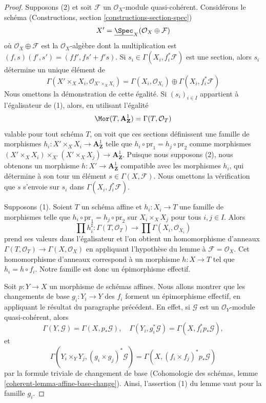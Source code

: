 \begin{proof}
Supposons (2) et soit $\mathcal{F}$ un $\mathcal{O}_X$-module quasi-cohérent.
Considérons le schéma
(Constructions, section \ref{constructions-section-spec})
$$
X' = \underline{\Spec}_X(\mathcal{O}_X \oplus \mathcal{F})
$$
où $\mathcal{O}_X \oplus \mathcal{F}$ est la $\mathcal{O}_X$-algèbre dont
la multiplication est
$(f, s)(f', s') = (ff', fs' + f's)$.
Si $s_i \in \Gamma(X_i, f_i^*\mathcal{F})$ est une section,
alors $s_i$ détermine un unique élément de
$$
\Gamma(X' \times_X X_i, \mathcal{O}_{X' \times_X X_i}) =
\Gamma(X_i, \mathcal{O}_{X_i}) \oplus \Gamma(X_i, f_i^*\mathcal{F})
$$
Nous omettons la démonstration de cette égalité.
Si $(s_i)_{i \in I}$ appartient à l'égalisateur de (1), alors, en utilisant
l'égalité
$$
\Mor(T, \mathbf{A}^1_\mathbf{Z}) = \Gamma(T, \mathcal{O}_T)
$$
valable pour tout schéma $T$, on voit que ces sections définissent une famille
de morphismes $h_i : X' \times_X X_i \to \mathbf{A}^1_\mathbf{Z}$ telle que
$h_i \circ \text{pr}_1 = h_j \circ \text{pr}_2$ comme morphismes
$(X' \times_X X_i) \times_{X'} (X' \times_X X_j) \to \mathbf{A}^1_\mathbf{Z}$.
Puisque nous supposons (2), nous obtenons un morphisme
$h : X' \to \mathbf{A}^1_\mathbf{Z}$ compatible avec les morphismes $h_i$,
qui détermine à son tour un élément
$s \in \Gamma(X, \mathcal{F})$.
Nous omettons la vérification que $s$ s'envoie sur $s_i$ dans
$\Gamma(X_i, f_i^*\mathcal{F})$.

\medskip\noindent
Supposons (1). Soient $T$ un schéma affine et $h_i : X_i \to T$
une famille de morphismes telle que
$h_i \circ \text{pr}_1 = h_j \circ \text{pr}_2$ sur
$X_i \times_X X_j$ pour tous $i, j \in I$. Alors
$$
\prod h_i^\sharp :
\Gamma(T, \mathcal{O}_T)
\to
\prod \Gamma(X_i, \mathcal{O}_{X_i})
$$
prend ses valeurs dans l'égalisateur et l'on obtient un homomorphisme d'anneaux
$\Gamma(T, \mathcal{O}_T) \to \Gamma(X, \mathcal{O}_X)$ en appliquant
l'hypothèse du lemme à $\mathcal{F} = \mathcal{O}_X$.
Cet homomorphisme d'anneaux correspond à un morphisme $h : X \to T$
tel que $h_i = h \circ f_i$. Notre famille est donc un épimorphisme effectif.

\medskip\noindent
Soit $p : Y \to X$ un morphisme de schémas affines. Nous allons montrer que
les changements de base $g_i : Y_i \to Y$ des $f_i$ forment un épimorphisme
effectif, en appliquant le résultat du paragraphe précédent.
En effet, si $\mathcal{G}$ est un $\mathcal{O}_Y$-module quasi-cohérent, alors
$$
\Gamma(Y, \mathcal{G}) = \Gamma(X, p_*\mathcal{G}),\quad
\Gamma(Y_i, g_i^*\mathcal{G}) = \Gamma(X, f_i^*p_*\mathcal{G}),
$$
et
$$
\Gamma(Y_i \times_Y Y_j, (g_i \times g_j)^*\mathcal{G}) =
\Gamma(X, (f_i \times f_j)^*p_*\mathcal{G})
$$
par la formule triviale de changement de base
(Cohomologie des schémas, lemme \ref{coherent-lemma-affine-base-change}).
Ainsi, l'assertion (1) du lemme vaut pour la famille $g_i$.
\end{proof}

